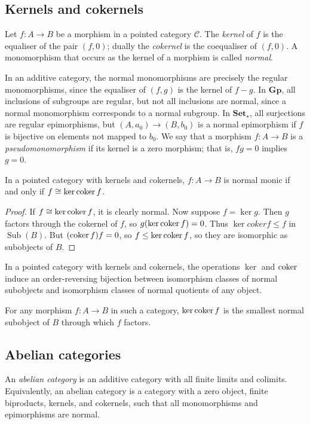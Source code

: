 \subsection{Kernels and cokernels}
\begin{definition}
    Let \( f : A \to B \) be a morphism in a pointed category \( \mathcal C \).
    The \emph{kernel} of \( f \) is the equaliser of the pair \( (f, 0) \); dually the \emph{cokernel} is the coequaliser of \( (f, 0) \).
    A monomorphism that occurs as the kernel of a morphism is called \emph{normal}.
\end{definition}
In an additive category, the normal monomorphisms are precisely the regular monomorphisms, since the equaliser of \( (f, g) \) is the kernel of \( f - g \).
In \( \mathbf{Gp} \), all inclusions of subgroups are regular, but not all inclusions are normal, since a normal monomorphism corresponds to a normal subgroup.
In \( \mathbf{Set}_\star \), all surjections are regular epimorphisms, but \( (A, a_0) \to (B, b_0) \) is a normal epimorphism if \( f \) is bijective on elements not mapped to \( b_0 \).
We say that a morphism \( f : A \to B \) is a \emph{pseudomonomorphism} if its kernel is a zero morphism; that is, \( fg = 0 \) implies \( g = 0 \).
\begin{lemma}
    In a pointed category with kernels and cokernels, \( f : A \to B \) is normal monic if and only if \( f \cong \ker \operatorname{coker} f \).
\end{lemma}
\begin{proof}
    If \( f \cong \ker \operatorname{coker} f \), it is clearly normal.
    Now suppose \( f = \ker g \).
    Then \( g \) factors through the cokernel of \( f \), so \( g (\ker \operatorname{coker} f) = 0 \).
    Thus \( \ker coker f \leq f \) in \( \operatorname{Sub}(B) \).
    But \( (\operatorname{coker} f) f = 0 \), so \( f \leq \ker \operatorname{coker} f \), so they are isomorphic as subobjects of \( B \).
\end{proof}
\begin{corollary}
    In a pointed category with kernels and cokernels, the operations \( \ker \) and \( \operatorname{coker} \) induce an order-reversing bijection between isomorphism classes of normal subobjects and isomorphism classes of normal quotients of any object.
\end{corollary}
\begin{remark}
    For any morphism \( f : A \to B \) in such a category, \( \ker \operatorname{coker} f \) is the smallest normal subobject of \( B \) through which \( f \) factors.
\end{remark}

\subsection{Abelian categories}
\begin{definition}
    An \emph{abelian category} is an additive category with all finite limits and colimits.
    Equivalently, an abelian category is a category with a zero object, finite biproducts, kernels, and cokernels, such that all monomorphisms and epimorphisms are normal.
\end{definition}
